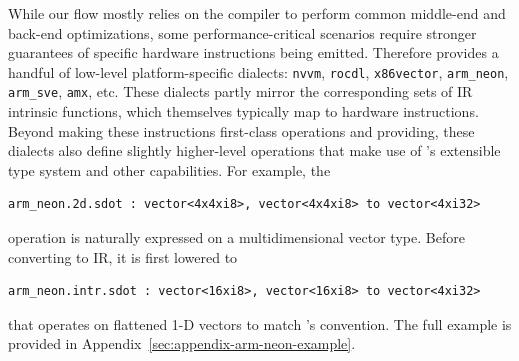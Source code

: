 While our flow mostly relies on the \LLVM compiler to perform common middle-end and back-end optimizations, some performance-critical scenarios require stronger guarantees of specific hardware instructions being emitted.
Therefore \MLIR provides a handful of low-level platform-specific dialects: \texttt{nvvm}, \texttt{rocdl}, \texttt{x86vector}, \texttt{arm\_neon}, \texttt{arm\_sve}, \texttt{amx}, etc.
These dialects partly mirror the corresponding sets of \LLVM IR intrinsic functions, which themselves typically map to hardware instructions.
Beyond making these instructions first-class operations and providing, these dialects also define slightly higher-level operations that make use of \MLIR's extensible type system and other capabilities.
For example, the
\begin{lstlisting}[language=mlir]
arm_neon.2d.sdot : vector<4x4xi8>, vector<4x4xi8> to vector<4xi32>
\end{lstlisting}
operation is naturally expressed on a \MLIR multidimensional vector type.
Before converting to \LLVM IR, it is first lowered to
\begin{lstlisting}[language=mlir]
arm_neon.intr.sdot : vector<16xi8>, vector<16xi8> to vector<4xi32>
\end{lstlisting}
that operates on flattened 1-D vectors to match \LLVM's convention.
The full example is provided in Appendix~\ref{sec:appendix-arm-neon-example}.
